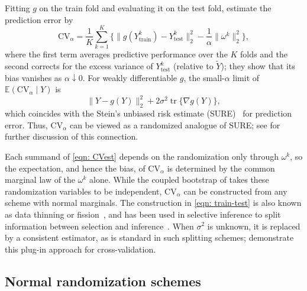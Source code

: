 \documentclass[12pt]{article}
\theoremstyle{general}
\newcommand{\cv}{{\mathrm{CV}}}
\begin{document}
Fitting $g$ on the train fold and evaluating it on the test fold, \citet{oliveira2024unbiased} estimate the prediction error by
\begin{equation}
\label{eqn: CVest}
\cv_{\alpha}= \frac{1}{K}\sum_{k=1}^K\Big\{ \big\|g(Y^{k}_{\text{train}}) - Y^{k}_{\text{test}}\big\|_2^2 -\frac{1}{\alpha}\|\omega^{k}\|_2^2 \Big\},
\end{equation}
where the first term averages predictive performance over the $K$ folds and the second corrects for the excess variance of $Y^k_{\text{test}}$ (relative to $\widetilde Y$); they show that its bias vanishes as $\alpha\downarrow0$.
For weakly differentiable $g$, the small-$\alpha$ limit of $\mathbb E(\cv_\alpha\mid Y)$ is
\[
\|Y-g(Y)\|_2^2+2\sigma^2\operatorname{tr}\{\nabla g(Y)\},
\]
which coincides with the Stein's unbiased risk estimate (SURE)~\citep{stein1981estimation} for prediction error. Thus, $\cv_\alpha$ can be viewed as a randomized analogue of SURE; see \citet{liu2024cross} for further discussion of this connection.

Each summand of \eqref{eqn: CVest} depends on the randomization only through $\omega^k$, so the expectation, and hence the bias, of $\cv_\alpha$ is determined by the common marginal law of the $\omega^k$ alone.
While the coupled bootstrap of \citet{oliveira2024unbiased} takes these randomization variables to be independent, $\cv_\alpha$ can be constructed from any scheme with normal marginals.
The construction in \eqref{eqn: train-test} is also known as data thinning or fission~\citep{neufeld2024data, leiner2025data}, and has been used in selective inference to split information between selection and inference~\citep{tian2018selective, rasines2023splitting, perry2026post}.
When $\sigma^2$ is unknown, it is replaced by a consistent estimator, as is standard in such splitting schemes; \citet{liu2024cross} demonstrate this plug-in approach for cross-validation.


\subsection{Normal randomization schemes}
\end{document}
